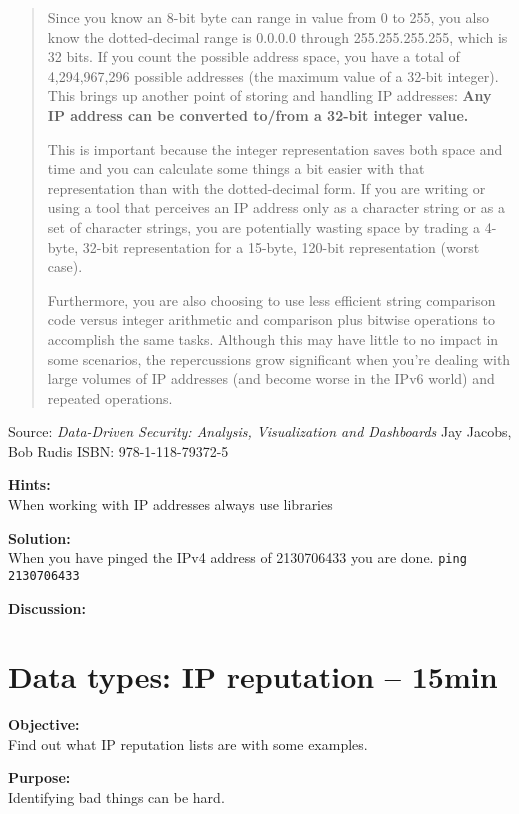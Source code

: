 \documentclass[a4paper,11pt,notitlepage]{report}
\begin{document}
\begin{quote}
Since you know an 8-bit byte can range in value from 0 to 255, you also know the dotted-decimal range is 0.0.0.0 through 255.255.255.255, which is 32 bits. If you count the possible address space, you have a total of 4,294,967,296 possible addresses (the maximum value of a 32-bit integer). This brings up another point of storing and handling IP addresses: {\bf Any IP address can be converted to/from a 32-bit integer value.}

This is important because the integer representation saves both space and time and you can calculate some things a bit easier with that representation than with the dotted-decimal form. If you are writing or using a tool that perceives an IP address only as a character string or as a set of character strings, you are potentially wasting space by trading a 4-byte, 32-bit representation for a 15-byte, 120-bit representation (worst case).

Furthermore, you are also choosing to use less efficient string comparison code versus integer arithmetic and comparison plus bitwise operations to accomplish the same tasks. Although this may have little to no impact in some scenarios, the repercussions grow significant when you’re dealing with large volumes of IP addresses (and become worse in the IPv6 world) and repeated operations.
\end{quote}
Source: \emph{Data-Driven Security: Analysis, Visualization and Dashboards} Jay Jacobs, Bob Rudis  ISBN: 978-1-118-79372-5


{\bf Hints:}\\
When working with IP addresses always use libraries

{\bf Solution:}\\
When you have pinged the IPv4 address of 2130706433 you are done.
\verb+ping 2130706433+


{\bf Discussion:}\\



\chapter{Data types: IP reputation -- 15min}
\label{siem:ip-reputation}

{\bf Objective:}\\
Find out what IP reputation lists are with some examples.


{\bf Purpose:}\\
Identifying bad things can be hard.
\end{document}
